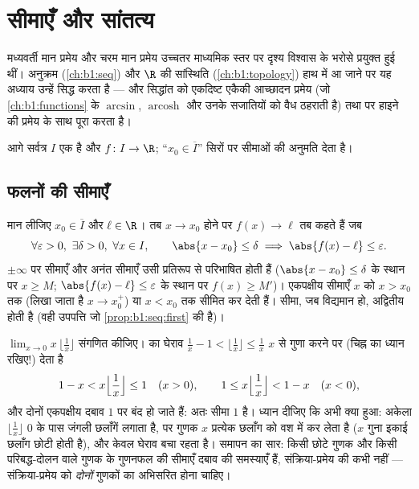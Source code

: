\chapter{सीमाएँ और सांतत्य}\label{ch:b1:continuity}

मध्यवर्ती मान प्रमेय और चरम मान प्रमेय उच्चतर माध्यमिक स्तर पर दृश्य विश्वास
के भरोसे प्रयुक्त हुई थीं। अनुक्रम (\cref{ch:b1:seq}) और $\R$ की सांस्थिति
(\cref{ch:b1:topology}) हाथ में आ जाने पर यह अध्याय उन्हें सिद्ध करता है ---
और सिद्धांत को एकदिष्ट एकैकी आच्छादन प्रमेय (जो \cref{ch:b1:functions} के
$\arcsin$, $\operatorname{arcosh}$ और उनके सजातियों को वैध ठहराती है) तथा
 पर हाइने की प्रमेय के साथ पूरा करता है।

आगे सर्वत्र $I$ एक  है और $f \colon I \to \R$; ``$x_0 \in \overline
I$'' सिरों पर सीमाओं की अनुमति देता है।

\section{फलनों की सीमाएँ}

\begin{definition}[किसी बिंदु पर सीमा]\label{def:b1:continuity:limit}
मान लीजिए $x_0 \in \overline{I}$ और $\ell \in \R$। तब $x \to x_0$ होने पर
$f(x) \to \ell$ तब कहते हैं जब
\[
\forall \varepsilon > 0,\ \exists \delta > 0,\ \forall x \in I,
\qquad \abs{x - x_0} \leq \delta \implies \abs{f(x) - \ell} \leq
\varepsilon .
\]
$\pm\infty$ पर सीमाएँ और अनंत सीमाएँ उसी प्रतिरूप से परिभाषित होती हैं
($\abs{x - x_0} \leq \delta$ के स्थान पर $x \geq M$; $\abs{f(x) - \ell} \leq
\varepsilon$ के स्थान पर $f(x) \geq M'$)। एकपक्षीय सीमाएँ $x$ को $x > x_0$
तक (लिखा जाता है $x \to x_0^+$) या $x < x_0$ तक सीमित कर देती हैं। सीमा, जब
विद्यमान हो, अद्वितीय होती है (वही उपपत्ति जो \cref{prop:b1:seq:first} की
है)।
\end{definition}

\begin{example}[दबाव से एक सीमा]\label{ex:b1:continuity:floorlimit}
$\lim_{x \to 0} x\,\bigl\lfloor \frac1x \bigr\rfloor$ संगणित कीजिए।  का
घेराव $\frac1x - 1 < \lfloor \frac1x \rfloor \leq \frac1x$ $x$ से गुणा करने
पर (चिह्न का ध्यान रखिए!) देता है
\[
1 - x < x\Bigl\lfloor \frac1x \Bigr\rfloor \leq 1 \quad (x > 0),
\qquad
1 \leq x\Bigl\lfloor \frac1x \Bigr\rfloor < 1 - x \quad (x < 0),
\]
और दोनों एकपक्षीय दबाव $1$ पर बंद हो जाते हैं: अतः सीमा $1$ है। ध्यान दीजिए
कि अभी क्या हुआ: अकेला $\lfloor \frac1x\rfloor$ $0$ के पास जंगली छलाँगें
लगाता है, पर गुणक $x$ प्रत्येक छलाँग को वश में कर लेता है ($x$ गुना इकाई
छलाँग छोटी होती है), और केवल घेराव बचा रहता है। समापन का सार: किसी छोटे गुणक
और किसी परिबद्ध-दोलन वाले गुणक के गुणनफल की सीमाएँ दबाव की समस्याएँ हैं,
संक्रिया-प्रमेय की कभी नहीं --- संक्रिया-प्रमेय को \emph{दोनों} गुणकों का
अभिसरित होना चाहिए।
\end{example}


